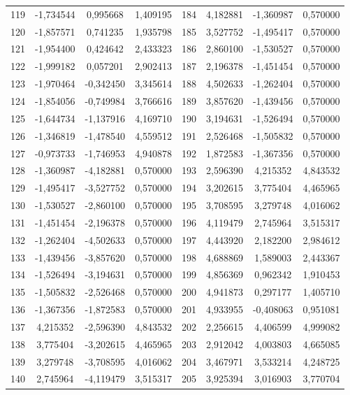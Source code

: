 \begin{apendicesenv}
\begin{table}[H]
\begin{tabular}{c c c c c c c c}
		119 & -1,734544 & 0,995668 & 1,409195 & 184 & 4,182881 & -1,360987 & 0,570000 \\
		120 & -1,857571 & 0,741235 & 1,935798 & 185 & 3,527752 & -1,495417 & 0,570000 \\
		121 & -1,954400 & 0,424642 & 2,433323 & 186 & 2,860100 & -1,530527 & 0,570000 \\
		122 & -1,999182 & 0,057201 & 2,902413 & 187 & 2,196378 & -1,451454 & 0,570000 \\
		123 & -1,970464 & -0,342450 & 3,345614 & 188 & 4,502633 & -1,262404 & 0,570000 \\
		124 & -1,854056 & -0,749984 & 3,766616 & 189 & 3,857620 & -1,439456 & 0,570000 \\
		125 & -1,644734 & -1,137916 & 4,169710 & 190 & 3,194631 & -1,526494 & 0,570000 \\
		126 & -1,346819 & -1,478540 & 4,559512 & 191 & 2,526468 & -1,505832 & 0,570000 \\
		127 & -0,973733 & -1,746953 & 4,940878 & 192 & 1,872583 & -1,367356 & 0,570000 \\
		128 & -1,360987 & -4,182881 & 0,570000 & 193 & 2,596390 & 4,215352 & 4,843532 \\
		129 & -1,495417 & -3,527752 & 0,570000 & 194 & 3,202615 & 3,775404 & 4,465965 \\
		130 & -1,530527 & -2,860100 & 0,570000 & 195 & 3,708595 & 3,279748 & 4,016062 \\
		131 & -1,451454 & -2,196378 & 0,570000 & 196 & 4,119479 & 2,745964 & 3,515317 \\
		132 & -1,262404 & -4,502633 & 0,570000 & 197 & 4,443920 & 2,182200 & 2,984612 \\
		133 & -1,439456 & -3,857620 & 0,570000 & 198 & 4,688869 & 1,589003 & 2,443367 \\
		134 & -1,526494 & -3,194631 & 0,570000 & 199 & 4,856369 & 0,962342 & 1,910453 \\
		135 & -1,505832 & -2,526468 & 0,570000 & 200 & 4,941873 & 0,297177 & 1,405710 \\
		136 & -1,367356 & -1,872583 & 0,570000 & 201 & 4,933955 & -0,408063 & 0,951081 \\
		137 & 4,215352 & -2,596390 & 4,843532 & 202 & 2,256615 & 4,406599 & 4,999082 \\
		138 & 3,775404 & -3,202615 & 4,465965 & 203 & 2,912042 & 4,003803 & 4,665085 \\
		139 & 3,279748 & -3,708595 & 4,016062 & 204 & 3,467971 & 3,533214 & 4,248725 \\
		140 & 2,745964 & -4,119479 & 3,515317 & 205 & 3,925394 & 3,016903 & 3,770704 \\

\end{tabular}
\end{table}
\end{apendicesenv}
